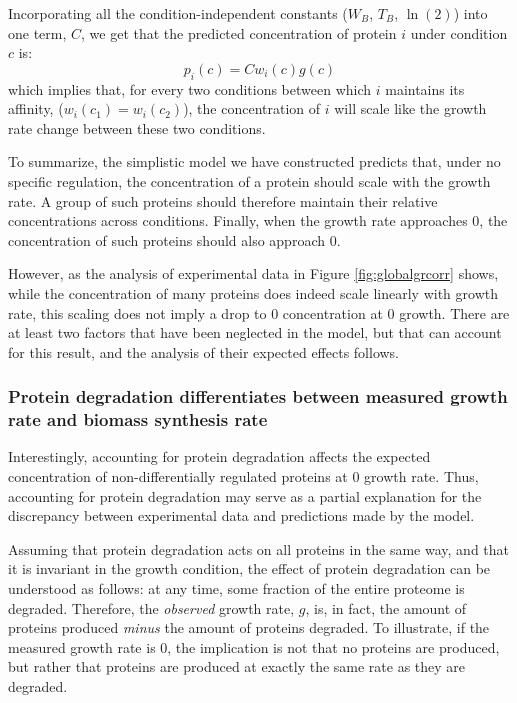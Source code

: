 \documentclass[notitlepage]{article}
\begin{document}
Incorporating all the condition-independent constants ($W_B$, $T_B$, $\ln(2)$) into one term, $C$, we get that the predicted concentration of protein $i$ under condition $c$ is:
\begin{equation}
  \label{eq:final-conc}
  p_i(c)=Cw_i(c)g(c)
\end{equation}
which implies that, for every two conditions between which $i$ maintains its affinity, ($w_i(c_1)=w_i(c_2)$), the concentration of $i$ will scale like the growth rate change between these two conditions.

To summarize, the simplistic model we have constructed predicts that, under no specific regulation, the concentration of a protein should scale with the growth rate.
A group of such proteins should therefore maintain their relative concentrations across conditions.
Finally, when the growth rate approaches 0, the concentration of such proteins should also approach 0.

However, as the analysis of experimental data in Figure \ref{fig:globalgrcorr} shows, while the concentration of many proteins does indeed scale linearly with growth rate, this scaling does not imply a drop to 0 concentration at 0 growth.
There are at least two factors that have been neglected in the model, but that can account for this result, and the analysis of their expected effects follows.

\subsubsection{Protein degradation differentiates between measured growth rate and biomass synthesis rate}
Interestingly, accounting for protein degradation affects the expected concentration of non-differentially regulated proteins at 0 growth rate.
Thus, accounting for protein degradation may serve as a partial explanation for the discrepancy between experimental data and predictions made by the model.

Assuming that protein degradation acts on all proteins in the same way, and that it is invariant in the growth condition, the effect of protein degradation can be understood as follows: at any time, some fraction of the entire proteome is degraded.
Therefore, the \emph{observed} growth rate, $g$, is, in fact, the amount of proteins produced \emph{minus} the amount of proteins degraded.
To illustrate, if the measured growth rate is 0, the implication is not that no proteins are produced, but rather that proteins are produced at exactly the same rate as they are degraded.
\end{document}
